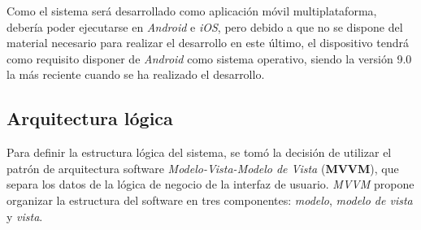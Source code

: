 Como el sistema será desarrollado como aplicación móvil multiplataforma, debería poder ejecutarse en \textit{Android} e 
\textit{iOS}, pero debido a que no se dispone del material necesario para realizar el desarrollo en este último, el 
dispositivo tendrá como requisito disponer de \textit{Android} como sistema operativo, siendo la versión 9.0 la más 
reciente cuando se ha realizado el desarrollo.


\subsection{Arquitectura lógica}
Para definir la estructura lógica del sistema, se tomó la decisión de utilizar el patrón de arquitectura software 
\textit{Modelo-Vista-Modelo de Vista} (\textbf{MVVM}), que separa los datos de la lógica de negocio de la interfaz 
de usuario. \textit{MVVM} propone organizar la estructura del software en tres componentes: \textit{modelo}, 
\textit{modelo de vista} y \textit{vista}.

